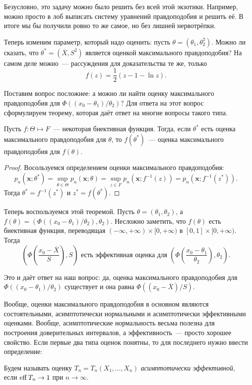 \begin{remark}
	Безусловно, это задачу можно было решить без всей этой экзотики. Например, 
	можно просто в лоб выписать систему уравнений правдоподобия и решить её. В 
	итоге мы бы получили ровно то же самое, но без лишней нервотрёпки.
\end{remark}

Теперь изменим параметр, который надо оценить: пусть \(\theta = (\theta_{1}, 
\theta_{2}^{2})\). Можно ли сказать, что \(\theta^{*} = (\overline{X}, S^2)\) 
является оценкой максимального правдоподобия? На самом деле можно~--- 
рассуждения для доказательства те же, только 
\[
	f(z) = \frac{1}{2}(z - 1 - \ln{z}).
\]

Поставим вопрос посложнее: а можно ли найти оценку максимального правдоподобия 
для \(\Phi((x_{0} - \theta_{1})/\theta_{2})\)? Для ответа на этот вопрос 
сформулируем теорему, которая даёт ответ на многие вопросы такого типа.
\begin{theorem}
	Пусть \(f: \Theta \mapsto F\)~--- некоторая биективная функция. Тогда, если 
	\(\theta^{*}\) есть оценка максимального правдоподобия для \(\theta\), то 
	\(f(\theta^{*})\)~--- оценка максимального правдоподобия для \(f(\theta)\).
\end{theorem}
\begin{proof}
	Восользуемся определением оценки максимального правдоподобия:
	\[
		p_{n}(\mathbf{x}; \theta^{*}) = \sup_{\theta \in \Theta} 
		p_{n}(\mathbf{x}; \theta) = \sup_{z \in F} p_{n}(\mathbf{x}; f^{-1}(z)) 
		= p_{n}(\mathbf{x}; f^{-1}(z^{*})).
	\]
	Тогда \(\theta^{*} = f^{-1}(z^{*})\) и \(z^{*} = f(\theta^{*})\).
\end{proof}

Теперь воспользуемся этой теоремой. Пусть \(\theta = (\theta_{1}, 
\theta_{2})\), а \(f(\theta) = (\Phi((x_{0} - \theta_{1})/\theta_{2}), 
\theta_{2})\). Несложно заметить, что \(f(\theta)\) есть биективная функция, 
переводящая \((-\infty, +\infty) \times [0, +\infty)\) в \([0, 1] \times [0, 
+\infty)\). Тогда
\[
	\left(\Phi\left(\frac{x_{0} - \overline{X}}{S}\right), S\right) \text{ есть 
	эффективная оценка для } \left(\Phi\left(\frac{x_{0} - 
	\theta_{1}}{\theta_{2}}\right), \theta_{2}\right).
\]

Это и даёт ответ на наш вопрос: да, оценка максимального правдоподобия для 
\(\Phi((x_{0} - \theta_{1})/\theta_{2})\) существует и она равна \(\Phi((x_{0} 
- \overline{X})/S)\).

Вообще, оценки максимального правдоподобия в основном являются состоятельными, 
асимптотически нормальными и асимптотически эффективными оценками. Вообще, 
асимптотические нормальность весьма полезна для построения доверительных 
интервалов, а эффективность~--- просто хорошее свойство. Если первые 
два типа оценок понятны, то для последнего нужно ввести определение:
\begin{definition}
	Будем называть оценку \(T_{n} = T_{n}(X_{1}, \dots, X_{n})\) 
	\emph{асимптотически эффективной}, если \(\operatorname{eff}{T_{n}} \to 1\) при \(n \to 
	\infty\).
\end{definition}

